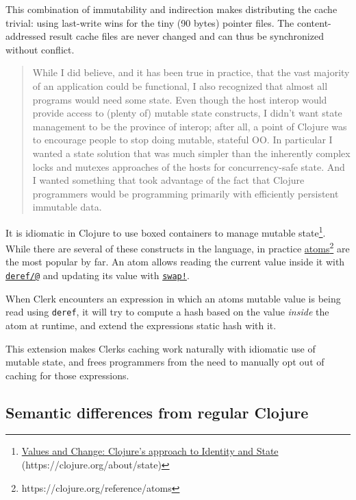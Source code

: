 \documentclass[sigconf,screen]{acmart}
\newcommand{\passthrough}[1]{#1}
\begin{document}
This combination of immutability and indirection makes distributing the cache trivial: using last-write wins for the tiny (90 bytes) pointer files. The content-addressed result cache files are never changed and can thus be synchronized without conflict.

\begin{quote}
While I did believe, and it has been true in practice, that the vast majority of an application could be functional, I also recognized that almost all programs would need some state. Even though the host interop would provide access to (plenty of) mutable state constructs, I didn't want state management to be the province of interop; after all, a point of Clojure was to encourage people to stop doing mutable, stateful OO. In particular I wanted a state solution that was much simpler than the inherently complex locks and mutexes approaches of the hosts for concurrency-safe state. And I wanted something that took advantage of the fact that Clojure programmers would be programming primarily with efficiently persistent immutable data. \cite{Hickey_2020}
\end{quote}

It is idiomatic in Clojure to use boxed containers to manage mutable state\footnote{{\href{https://clojure.org/about/state}{Values and Change: Clojure's approach to Identity and State} (https://clojure.org/about/state)}}. While there are several of these constructs in the language, in practice {\href{https://clojure.org/reference/atoms}{atoms}\footnote{https://clojure.org/reference/atoms}} are the most popular by far. An atom allows reading the current value inside it with {\href{https://clojuredocs.org/clojure.core/deref}{\passthrough{\lstinline!deref/@!}}} and updating it\textquotesingle s value with {\href{https://clojuredocs.org/clojure.core/swap!}{\passthrough{\lstinline"swap!"}}}.

When Clerk encounters an expression in which an atom\textquotesingle s mutable value is being read using \passthrough{\lstinline!deref!}, it will try to compute a hash based on the value \emph{inside} the atom  at runtime, and extend the expression\textquotesingle s static hash with it.

This extension makes Clerk\textquotesingle s caching work naturally with idiomatic use of mutable state, and frees programmers from the need to manually opt out of caching for those expressions.

\hypertarget{semantic-differences-from-regular-clojure}{%
\subsection{Semantic differences from regular Clojure}\label{semantic-differences-from-regular-clojure}}
\end{document}
